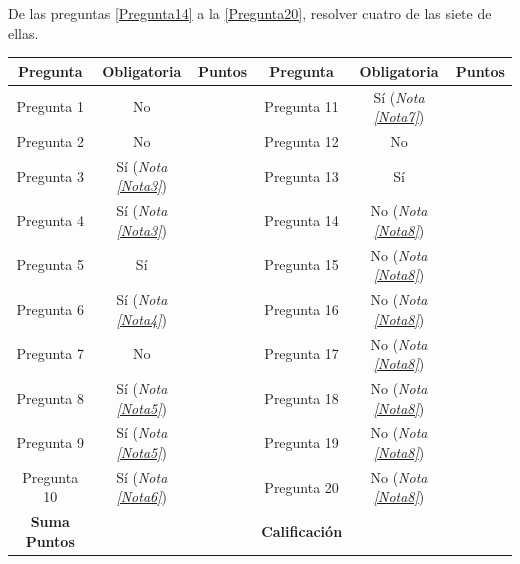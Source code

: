 \begin{Note}\label{Nota8}
De las preguntas \ref{Pregunta14} a la \ref{Pregunta20}, resolver cuatro de las siete de ellas.
\end{Note}

\begin{table}[h]
\centering
\begin{tabular}{|c||c|c||c||c|c|}\hline
\textbf{Pregunta} &  \textbf{Obligatoria} & \textbf{Puntos}&\textbf{Pregunta} &  \textbf{Obligatoria} & \textbf{Puntos}\\\hline\hline
Pregunta 1 & No &&Pregunta 11 & S\'i (\textit{Nota \ref{Nota7}})&\\\hline
Pregunta 2 & No &&Pregunta 12 & No&\\\hline
Pregunta 3 & S\'i (\textit{Nota \ref{Nota3}})&&Pregunta 13 & S\'i&\\\hline
Pregunta 4 & S\'i (\textit{Nota \ref{Nota3}})&&Pregunta 14 & No (\textit{Nota \ref{Nota8}})&\\\hline
Pregunta 5 & S\'i&&Pregunta 15 & No (\textit{Nota \ref{Nota8}})&\\\hline
Pregunta 6 & S\'i (\textit{Nota \ref{Nota4}})&&Pregunta 16 & No (\textit{Nota \ref{Nota8}})&\\\hline
Pregunta 7 & No&&Pregunta 17 & No (\textit{Nota \ref{Nota8}})&\\\hline
Pregunta 8 & S\'i (\textit{Nota \ref{Nota5}})&&Pregunta 18 & No (\textit{Nota \ref{Nota8}})&\\\hline
Pregunta 9 & S\'i (\textit{Nota \ref{Nota5}})&&Pregunta 19 & No (\textit{Nota \ref{Nota8}})&\\\hline
Pregunta 10 &S\'i (\textit{Nota \ref{Nota6}})&&Pregunta 20 & No (\textit{Nota \ref{Nota8}})&\\\hline\hline
\textbf{Suma Puntos} & &&\textbf{Calificaci\'on} & &\\\hline
\end{tabular}
\end{table}
